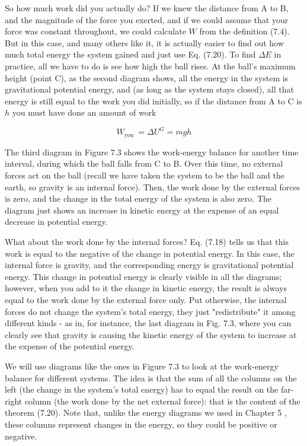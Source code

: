 \documentclass[10pt]{article}
\begin{document}
So how much work did you actually do? If we knew the distance from A to B, and the magnitude of the force you exerted, and if we could assume that your force was constant throughout, we could calculate $W$ from the definition (7.4). But in this case, and many others like it, it is actually easier to find out how much total energy the system gained and just use Eq. (7.20). To find $\Delta E$ in\\
practice, all we have to do is see how high the ball rises. At the ball's maximum height (point C), as the second diagram shows, all the energy in the system is gravitational potential energy, and (as long as the system stays closed), all that energy is still equal to the work you did initially, so if the distance from A to C is $h$ you must have done an amount of work


\begin{equation*}
W_{\text {you }}=\Delta U^{G}=m g h \tag{7.22}
\end{equation*}


The third diagram in Figure 7.3 shows the work-energy balance for another time interval, during which the ball falls from C to B. Over this time, no external forces act on the ball (recall we have taken the system to be the ball and the earth, so gravity is an internal force). Then, the work done by the external forces is zero, and the change in the total energy of the system is also zero. The diagram just shows an increase in kinetic energy at the expense of an equal decrease in potential energy.

What about the work done by the internal forces? Eq. (7.18) tells us that this work is equal to the negative of the change in potential energy. In this case, the internal force is gravity, and the corresponding energy is gravitational potential energy. This change in potential energy is clearly visible in all the diagrams; however, when you add to it the change in kinetic energy, the result is always equal to the work done by the external force only. Put otherwise, the internal forces do not change the system's total energy, they just "redistribute" it among different kinds - as in, for instance, the last diagram in Fig. 7.3, where you can clearly see that gravity is causing the kinetic energy of the system to increase at the expense of the potential energy.

We will use diagrams like the ones in Figure 7.3 to look at the work-energy balance for different systems. The idea is that the sum of all the columns on the left (the change in the system's total energy) has to equal the result on the far-right column (the work done by the net external force): that is the content of the theorem (7.20). Note that, unlike the energy diagrams we used in Chapter 5 , these columns represent changes in the energy, so they could be positive or negative.
\end{document}
